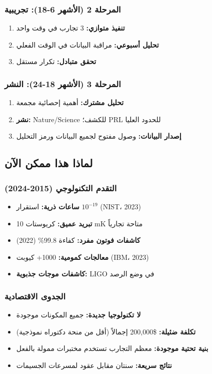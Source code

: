 \documentclass[11pt,a4paper]{article}
\begin{document}
	\subsubsection{المرحلة 2 (الأشهر 6-18): تجريبية}
	\begin{enumerate}
		\item \textbf{تنفيذ متوازي:} 3 تجارب في وقت واحد
		\item \textbf{تحليل أسبوعي:} مراقبة البيانات في الوقت الفعلي
		\item \textbf{تحقق متبادل:} تكرار مستقل
	\end{enumerate}
	
	\subsubsection{المرحلة 3 (الأشهر 18-24): النشر}
	\begin{enumerate}
		\item \textbf{تحليل مشترك:} أهمية إحصائية مجمعة
		\item \textbf{نشر:} Nature/Science للكشف؛ PRL للحدود العليا
		\item \textbf{إصدار البيانات:} وصول مفتوح لجميع البيانات ورمز التحليل
	\end{enumerate}
	
	\subsection{لماذا هذا ممكن الآن}
	
	\subsubsection{التقدم التكنولوجي (2015-2024)}
	\begin{itemize}
		\item \textbf{ساعات ذرية:} استقرار $10^{-19}$ (NIST، 2023)
		\item \textbf{تبريد عميق:} كريوستات 10 mK متاحة تجارياً
		\item \textbf{كاشفات فوتون مفرد:} كفاءة 99.8\% (2022)
		\item \textbf{معالجات كمومية:} 1000+ كيوبت (IBM، 2023)
		\item \textbf{كاشفات موجات جذبوية:} LIGO في وضع الرصد
	\end{itemize}
	
	\subsubsection{الجدوى الاقتصادية}
	\begin{itemize}
		\item \textbf{لا تكنولوجيا جديدة:} جميع المكونات موجودة
		\item \textbf{تكلفة ضئيلة:} \$200,000 إجمالاً (أقل من منحة دكتوراه نموذجية)
		\item \textbf{بنية تحتية موجودة:} معظم التجارب تستخدم مختبرات ممولة بالفعل
		\item \textbf{نتائج سريعة:} سنتان مقابل عقود لمسرعات الجسيمات
	\end{itemize}
	
\end{document}
